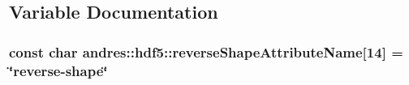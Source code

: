 \subsection{Variable Documentation}
\hypertarget{namespaceandres_1_1hdf5_acf79cfe1ea0769086a46970fd58188a7}{}
\subsubsection[{reverse\+Shape\+Attribute\+Name}]{\setlength{\rightskip}{0pt plus 5cm}const char andres\+::hdf5\+::reverse\+Shape\+Attribute\+Name\mbox{[}14\mbox{]} = \char`\"{}reverse-\/shape\char`\"{}}\label{namespaceandres_1_1hdf5_acf79cfe1ea0769086a46970fd58188a7}
